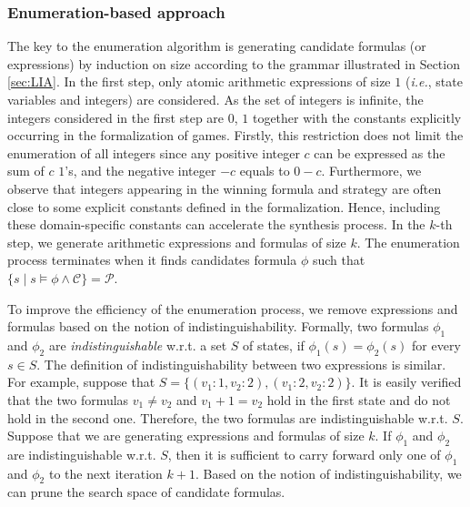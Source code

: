 \documentclass[review]{elsarticle}
\newcommand{\set}[1]{\{ #1 \}}
\newcommand{\positiveSet}{\mathcal{P}}
\newcommand{\constraint}{\mathcal{C}}
\newcommand\ie{{\it i.e.}}
\begin{document}
	\subsubsection{Enumeration-based approach}
	The key to the enumeration algorithm is generating candidate formulas (or expressions) by induction on size according to the grammar illustrated in Section \ref{sec:LIA}.
	In the first step, only atomic arithmetic expressions of size $1$ (\ie, state variables and integers) are considered.
	As the set of integers is infinite, the integers considered in the first step are $0$, $1$ together with the constants explicitly occurring in the formalization of games.
	Firstly, this restriction does not limit the enumeration of all integers since any positive integer $c$ can be expressed as the sum of $c$ $1$'s, and the negative integer $-c$ equals to $0 - c$.
	Furthermore, we observe that integers appearing in the winning formula and strategy are often close to some explicit constants defined in the formalization.
	Hence, including these domain-specific constants can accelerate the synthesis process.
	In the $k$-th step, we generate arithmetic expressions and formulas of size $k$.
	The enumeration process terminates when it finds candidates formula $\phi$ such that $\set{s \mid s \models \phi \land \constraint} = \positiveSet$.

	To improve the efficiency of the enumeration process, we remove expressions and formulas based on the notion of indistinguishability.
	Formally, two formulas $\phi_1$ and $\phi_2$ are \textit{indistinguishable} w.r.t. a set $S$ of states, if $\phi_1(s) = \phi_2(s)$ for every $s \in S$.
	The definition of indistinguishability between two expressions is similar.
	For example, suppose that $S = \set{(v_1 : 1, v_2 : 2), (v_1 : 2, v_2 : 2)}$.
	It is easily verified that the two formulas $v_1 \neq v_2$ and $v_1 + 1 = v_2$ hold in the first state and do not hold in the second one.
	Therefore, the two formulas are indistinguishable w.r.t. $S$.
	Suppose that we are generating expressions and formulas of size $k$.
	If $\phi_1$ and $\phi_2$ are indistinguishable w.r.t. $S$, then it is sufficient to carry forward only one of $\phi_1$ and $\phi_2$ to the next iteration $k + 1$.
	Based on the notion of indistinguishability, we can prune the search space of candidate formulas.
\end{document}
